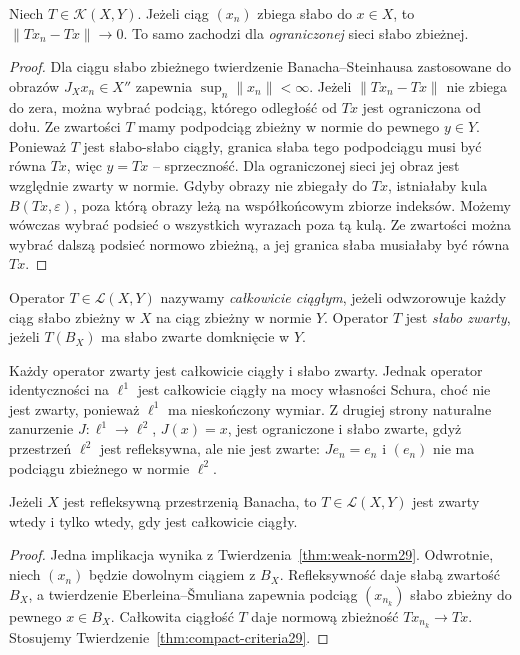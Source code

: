 \begin{twierdzenie}
\label{thm:weak-norm29}
Niech $T\in\mathcal K(X,Y)$. Jeżeli ciąg $(x_n)$ zbiega
słabo do $x\in X$, to $\|Tx_n-Tx\|\to0$.
To samo zachodzi dla \emph{ograniczonej} sieci słabo zbieżnej.
\end{twierdzenie}
\begin{proof}
Dla ciągu słabo zbieżnego twierdzenie Banacha--Steinhausa
zastosowane do obrazów $J_Xx_n\in X''$ zapewnia
$\sup_n\|x_n\|<\infty$. Jeżeli $\|Tx_n-Tx\|$ nie zbiega
do zera, można wybrać podciąg, którego odległość od $Tx$
jest ograniczona od dołu. Ze zwartości $T$ mamy podpodciąg
zbieżny w normie do pewnego $y\in Y$. Ponieważ $T$
jest słabo-słabo ciągły, granica słaba tego podpodciągu
musi być równa $Tx$, więc $y=Tx$ -- sprzeczność.
Dla ograniczonej sieci jej obraz jest względnie zwarty
w normie. Gdyby obrazy nie zbiegały do $Tx$, istniałaby
kula $B(Tx,\varepsilon)$, poza którą obrazy leżą
na współkońcowym zbiorze indeksów. Możemy wówczas
wybrać podsieć o wszystkich wyrazach poza tą kulą.
Ze zwartości można wybrać dalszą podsieć normowo zbieżną,
a jej granica słaba musiałaby być równa $Tx$.
\end{proof}

\begin{definicja}
\label{def:completely-continuous29}
Operator $T\in\mathcal L(X,Y)$ nazywamy
\emph{całkowicie ciągłym}, jeżeli odwzorowuje każdy ciąg
słabo zbieżny w $X$ na ciąg zbieżny w normie $Y$.
Operator $T$ jest \emph{słabo zwarty}, jeżeli
$T(B_X)$ ma słabo zwarte domknięcie w $Y$.
\end{definicja}

\begin{przyklad}
\label{ex:weak-vs-compact29}
Każdy operator zwarty jest całkowicie ciągły i słabo zwarty.
Jednak operator identyczności na $\ell^1$ jest całkowicie
ciągły na mocy własności Schura, choć nie jest zwarty,
ponieważ $\ell^1$ ma nieskończony wymiar.
Z drugiej strony naturalne zanurzenie
$J:\ell^1\to\ell^2$, $J(x)=x$, jest ograniczone
i słabo zwarte, gdyż przestrzeń $\ell^2$ jest refleksywna,
ale nie jest zwarte: $Je_n=e_n$ i $(e_n)$ nie ma
podciągu zbieżnego w normie $\ell^2$.
\end{przyklad}

\begin{twierdzenie}
\label{thm:reflexive-complete-cont29}
Jeżeli $X$ jest refleksywną przestrzenią Banacha, to
$T\in\mathcal L(X,Y)$ jest zwarty wtedy i tylko wtedy,
gdy jest całkowicie ciągły.
\end{twierdzenie}
\begin{proof}
Jedna implikacja wynika z
Twierdzenia~\ref{thm:weak-norm29}. Odwrotnie,
niech $(x_n)$ będzie dowolnym ciągiem z $B_X$.
Refleksywność daje słabą zwartość $B_X$, a twierdzenie
Eberleina--\v Smuliana zapewnia podciąg $(x_{n_k})$
słabo zbieżny do pewnego $x\in B_X$.
Całkowita ciągłość $T$ daje normową zbieżność
$Tx_{n_k}\to Tx$. Stosujemy
Twierdzenie~\ref{thm:compact-criteria29}.
\end{proof}

